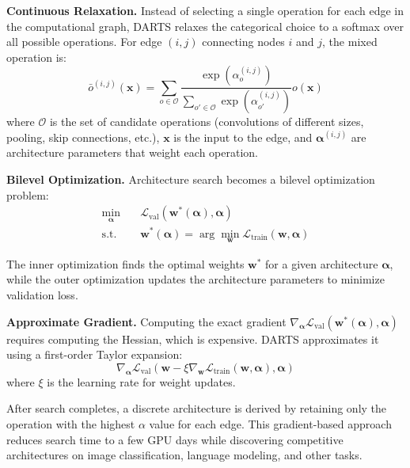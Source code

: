 \textbf{Continuous Relaxation.} Instead of selecting a single operation for each edge in the computational graph, DARTS relaxes the categorical choice to a softmax over all possible operations. For edge $(i,j)$ connecting nodes $i$ and $j$, the mixed operation is:
\begin{equation}
\bar{o}^{(i,j)}(\mathbf{x}) = \sum_{o \in \mathcal{O}} \frac{\exp(\alpha_o^{(i,j)})}{\sum_{o' \in \mathcal{O}} \exp(\alpha_{o'}^{(i,j)})} o(\mathbf{x})
\end{equation}
where $\mathcal{O}$ is the set of candidate operations (convolutions of different sizes, pooling, skip connections, etc.), $\mathbf{x}$ is the input to the edge, and $\boldsymbol{\alpha}^{(i,j)}$ are architecture parameters that weight each operation.

\textbf{Bilevel Optimization.} Architecture search becomes a bilevel optimization problem:
\begin{align}
\min_{\boldsymbol{\alpha}} \quad & \mathcal{L}_{\text{val}}(\mathbf{w}^*(\boldsymbol{\alpha}), \boldsymbol{\alpha}) \\
\text{s.t.} \quad & \mathbf{w}^*(\boldsymbol{\alpha}) = \arg\min_{\mathbf{w}} \mathcal{L}_{\text{train}}(\mathbf{w}, \boldsymbol{\alpha})
\end{align}

The inner optimization finds the optimal weights $\mathbf{w}^*$ for a given architecture $\boldsymbol{\alpha}$, while the outer optimization updates the architecture parameters to minimize validation loss.

\textbf{Approximate Gradient.} Computing the exact gradient $\nabla_{\boldsymbol{\alpha}} \mathcal{L}_{\text{val}}(\mathbf{w}^*(\boldsymbol{\alpha}), \boldsymbol{\alpha})$ requires computing the Hessian, which is expensive. DARTS approximates it using a first-order Taylor expansion:
\begin{equation}
\nabla_{\boldsymbol{\alpha}} \mathcal{L}_{\text{val}}(\mathbf{w} - \xi \nabla_{\mathbf{w}} \mathcal{L}_{\text{train}}(\mathbf{w}, \boldsymbol{\alpha}), \boldsymbol{\alpha})
\end{equation}
where $\xi$ is the learning rate for weight updates.

After search completes, a discrete architecture is derived by retaining only the operation with the highest $\alpha$ value for each edge. This gradient-based approach reduces search time to a few GPU days while discovering competitive architectures on image classification, language modeling, and other tasks.

